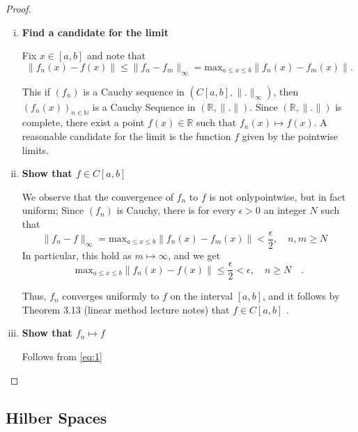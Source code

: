 \documentclass{article}
\theoremstyle{remark}
\begin{document}
\begin{proof}
  \begin{enumerate}[(i)]
    \item \textbf{Find a candidate for the limit}  
    \par  
    Fix $x \in [a,b]$ and note that \[
      \|f_{n}\left( x \right)  - f\left( x \right) \| \le \|f_n - f_m\|_{\infty} = \text{max}_{a \le x \le b } \|f_n\left( x \right) - f_m\left( x \right) \|.
    \] 

    This if $\left( f_n \right) $ is a Cauchy sequence in $\left( C[a,b], \|.\|_{\infty} \right) $, then $\left( f_n\left( x \right)  \right)_{n \in \mathbb{N}} $ is a Cauchy Sequence in $\left( \mathbb{R}, \|.\| \right) $. Since $\left( \mathbb{R}, \|.\| \right) $ is complete, there exist a point $f\left( x \right) \in \mathbb{R}$ such that $f_{n}\left( x \right) \mapsto f\left( x \right) $. A reasonable candidate for the limit is the function $f$ given by the pointwise limits. 

  \item \textbf{Show that $f \in C[a,b]$} 
      \par
      We observe that the convergence of $f_n$ to $f$ is not onlypointwise, but in fact uniform; Since $\left( f_n \right) $ is Cauchy, there is for every $\epsilon > 0 $ an integer $N$ such that \[
        \|f_n - f\|_{\infty} =  \text{max}_{a \le x \le b} \|f_n\left( x \right) -  f_m\left( x \right) \| < \frac{\epsilon}{2}, \quad n,m \ge N \quad  
      \] 
      In particular, this hold as $m \mapsto \infty$, and we get 
      \begin{equation}
      \label{eq:1}
      \text{max}_{a \le x \le b} \|f_n\left( x \right)  - f\left( x \right) \| \le \frac{\epsilon}{2} < \epsilon, \quad n\ge N \quad  
      .\end{equation}

      Thus, $f_n$ converges uniformly to $f$ on the interval $[a,b]$, and it follows by Theorem 3.13 (linear method lecture notes) that $f \in C[a,b]$ .

    \item \textbf{Show that $f_n \mapsto f$} 
        \par
        Follows from \eqref{eq:1} 

  \end{enumerate}
\end{proof}


\subsection{Hilber Spaces}%
\label{sub:hilber_spaces}
\end{document}
